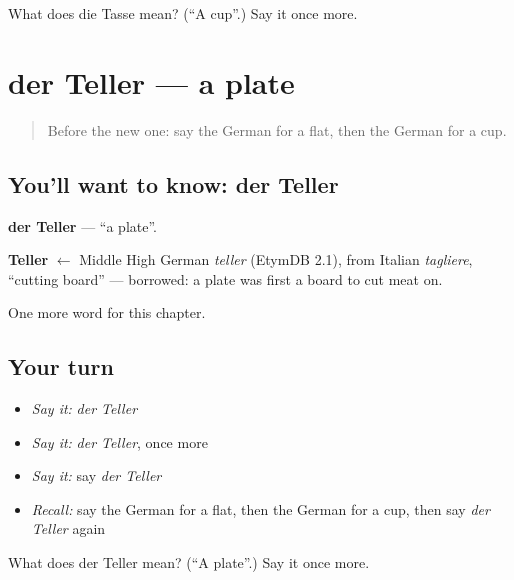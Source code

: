 \begin{tcolorbox}[breakable,colback=teal!4,colframe=teal!35!black,title={Before you move on}]
What does die Tasse mean? (\textquotedblleft{}A cup\textquotedblright{}.) Say it once more.
\end{tcolorbox}
\section[der Teller]{der Teller — a plate}

\label{lesson:GE-C79-teller}



\begin{quote}
Before the new one: say the German for a flat, then the German for a cup.
\end{quote}

\subsection*{You'll want to know: der Teller}
\textbf{der Teller} — \textquotedblleft{}a plate\textquotedblright{}.

\begin{cousinweb}
\textbf{Teller} $\leftarrow$ Middle High German \emph{teller} (EtymDB 2.1), from Italian \emph{tagliere}, \textquotedblleft{}cutting board\textquotedblright{} — borrowed: a plate was first a board to cut meat on.
\end{cousinweb}

\begin{grammarlens}[title={What you've built}]
One more word for this chapter.
\end{grammarlens}

\subsection*{Your turn}
\begin{itemize}
\raggedright
  \item \emph{Say it:} \emph{der Teller}
  \item \emph{Say it:} \emph{der Teller}, once more
  \item \emph{Say it:} say \emph{der Teller}
  \item \emph{Recall:} say the German for a flat, then the German for a cup, then say \emph{der Teller} again
\end{itemize}

\begin{tcolorbox}[breakable,colback=teal!4,colframe=teal!35!black,title={Before you move on}]
What does der Teller mean? (\textquotedblleft{}A plate\textquotedblright{}.) Say it once more.
\end{tcolorbox}

